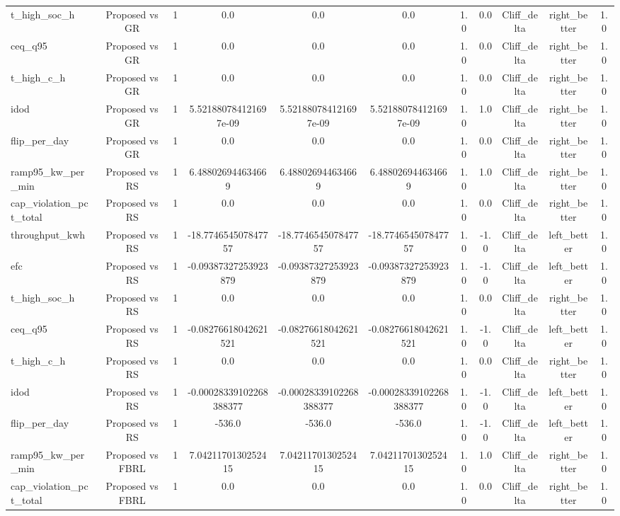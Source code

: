\begin{table}[t]
\begin{tabular}{lcccccccccc}
t\_high\_soc\_h & Proposed vs GR & 1 & 0.0 & 0.0 & 0.0 & 1.0 & 0.0 & Cliff\_delta & right\_better & 1.0 \\
ceq\_q95 & Proposed vs GR & 1 & 0.0 & 0.0 & 0.0 & 1.0 & 0.0 & Cliff\_delta & right\_better & 1.0 \\
t\_high\_c\_h & Proposed vs GR & 1 & 0.0 & 0.0 & 0.0 & 1.0 & 0.0 & Cliff\_delta & right\_better & 1.0 \\
idod & Proposed vs GR & 1 & 5.521880784121697e-09 & 5.521880784121697e-09 & 5.521880784121697e-09 & 1.0 & 1.0 & Cliff\_delta & right\_better & 1.0 \\
flip\_per\_day & Proposed vs GR & 1 & 0.0 & 0.0 & 0.0 & 1.0 & 0.0 & Cliff\_delta & right\_better & 1.0 \\
ramp95\_kw\_per\_min & Proposed vs RS & 1 & 6.488026944634669 & 6.488026944634669 & 6.488026944634669 & 1.0 & 1.0 & Cliff\_delta & right\_better & 1.0 \\
cap\_violation\_pct\_total & Proposed vs RS & 1 & 0.0 & 0.0 & 0.0 & 1.0 & 0.0 & Cliff\_delta & right\_better & 1.0 \\
throughput\_kwh & Proposed vs RS & 1 & -18.774654507847757 & -18.774654507847757 & -18.774654507847757 & 1.0 & -1.0 & Cliff\_delta & left\_better & 1.0 \\
efc & Proposed vs RS & 1 & -0.09387327253923879 & -0.09387327253923879 & -0.09387327253923879 & 1.0 & -1.0 & Cliff\_delta & left\_better & 1.0 \\
t\_high\_soc\_h & Proposed vs RS & 1 & 0.0 & 0.0 & 0.0 & 1.0 & 0.0 & Cliff\_delta & right\_better & 1.0 \\
ceq\_q95 & Proposed vs RS & 1 & -0.08276618042621521 & -0.08276618042621521 & -0.08276618042621521 & 1.0 & -1.0 & Cliff\_delta & left\_better & 1.0 \\
t\_high\_c\_h & Proposed vs RS & 1 & 0.0 & 0.0 & 0.0 & 1.0 & 0.0 & Cliff\_delta & right\_better & 1.0 \\
idod & Proposed vs RS & 1 & -0.00028339102268388377 & -0.00028339102268388377 & -0.00028339102268388377 & 1.0 & -1.0 & Cliff\_delta & left\_better & 1.0 \\
flip\_per\_day & Proposed vs RS & 1 & -536.0 & -536.0 & -536.0 & 1.0 & -1.0 & Cliff\_delta & left\_better & 1.0 \\
ramp95\_kw\_per\_min & Proposed vs FBRL & 1 & 7.0421170130252415 & 7.0421170130252415 & 7.0421170130252415 & 1.0 & 1.0 & Cliff\_delta & right\_better & 1.0 \\
cap\_violation\_pct\_total & Proposed vs FBRL & 1 & 0.0 & 0.0 & 0.0 & 1.0 & 0.0 & Cliff\_delta & right\_better & 1.0 \\

\end{tabular}
\end{table}
